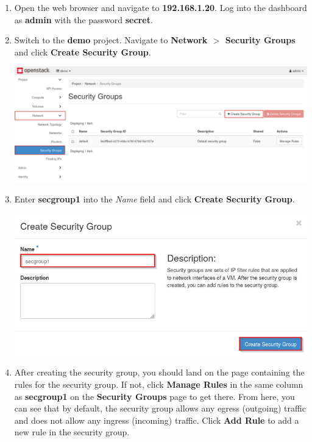 \documentclass[letterpaper, 12pt]{article}
\begin{document}
\begin{enumerate}
    \item Open the web browser and navigate to \textbf{192.168.1.20}.
    Log into the dashboard as \textbf{admin} with the password \textbf{secret}.

    \item Switch to the \textbf{demo} project.
    Navigate to \textbf{Network $>$ Security Groups} and click \textbf{Create Security Group}.

    \begin{center}
        \includegraphics[width=\linewidth]{images/part5/step2.png}
    \end{center}

    \item Enter \textbf{secgroup1} into the \textit{Name} field and click \textbf{Create Security Group}.

    \begin{center}
        \includegraphics[width=\linewidth]{images/part5/step3.png}
    \end{center}

    \item After creating the security group, you should land on the page containing the rules for the security group.
    If not, click \textbf{Manage Rules} in the same column as \textbf{secgroup1} on the \textbf{Security Groups} page to get there.
    From here, you can see that by default, the security group allows any egress (outgoing) traffic and does not allow any ingress (incoming) traffic.
    Click \textbf{Add Rule} to add a new rule in the security group.


\end{enumerate}
\end{document}

